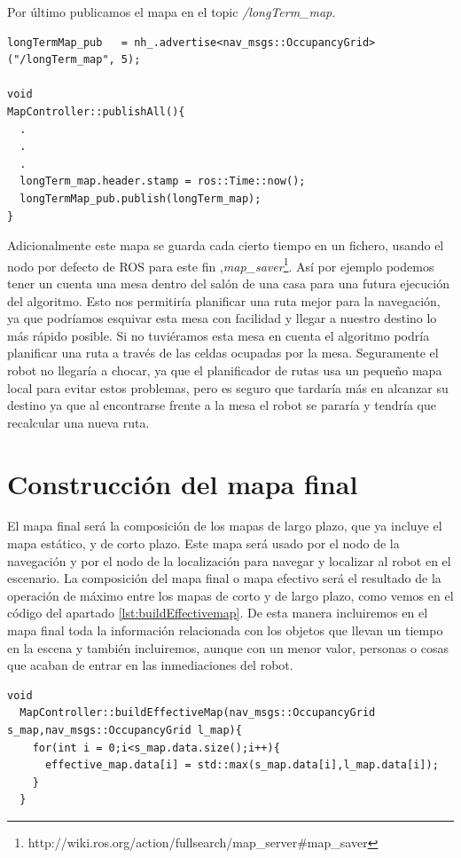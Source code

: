 Por último publicamos el mapa en el topic \textit{/longTerm\_map}.

\begin{lstlisting}[caption=Publicación del mapa de largo plazo, label={lst:longmappublish}]
longTermMap_pub   = nh_.advertise<nav_msgs::OccupancyGrid>("/longTerm_map", 5); 

void
MapController::publishAll(){
  .
  .
  .
  longTerm_map.header.stamp = ros::Time::now();
  longTermMap_pub.publish(longTerm_map);
}
\end{lstlisting}


Adicionalmente este mapa se guarda cada cierto tiempo en un fichero, usando el nodo por defecto de ROS para este fin ,\textit{map\_saver}\footnote{http://wiki.ros.org/action/fullsearch/map\_server\#map\_saver}. Así por ejemplo podemos tener un cuenta una mesa dentro del salón de una casa para una futura ejecución del algoritmo. Esto nos permitiría planificar una ruta mejor para la navegación, ya que podríamos esquivar esta mesa con facilidad y llegar a nuestro destino lo más rápido posible. Si no tuviéramos esta mesa en cuenta el algoritmo podría planificar una ruta a través de las celdas ocupadas por la mesa. Seguramente el robot no llegaría a chocar, ya que el planificador de rutas usa un pequeño mapa local para evitar estos problemas, pero es seguro que tardaría más en alcanzar su destino ya que al encontrarse frente a la mesa el robot se pararía y tendría que recalcular una nueva ruta. 



\section{Construcción del mapa final}
\label{sec:construccionmap}
El mapa final será la composición de los mapas de largo plazo, que ya incluye el mapa estático, y de corto plazo. Este mapa será usado por el nodo de la navegación y por el nodo de la localización para navegar y localizar al robot en el escenario. La composición del mapa final o mapa efectivo será el resultado de la operación de máximo entre los mapas de corto y de largo plazo, como vemos en el código del apartado \ref{lst:buildEffectivemap}. De esta manera incluiremos en el mapa final toda la información relacionada con los objetos que llevan un tiempo en la escena y también incluiremos, aunque con un menor valor, personas o cosas que acaban de entrar en las inmediaciones del robot.
\pagebreak

\begin{lstlisting}[caption=Composición del mapa final, label={lst:buildEffectivemap}]
  void
  MapController::buildEffectiveMap(nav_msgs::OccupancyGrid s_map,nav_msgs::OccupancyGrid l_map){
    for(int i = 0;i<s_map.data.size();i++){
      effective_map.data[i] = std::max(s_map.data[i],l_map.data[i]);
    }
  }
\end{lstlisting}

